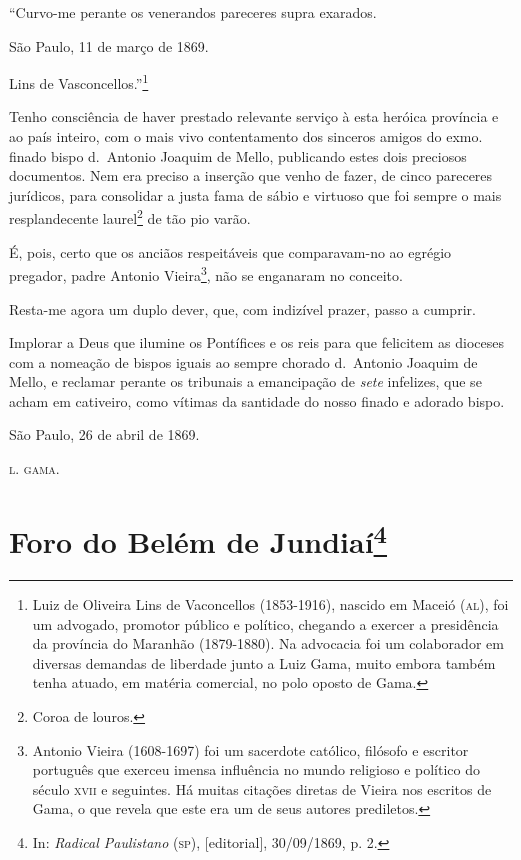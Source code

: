 ``Curvo-me perante os venerandos pareceres supra exarados.

São Paulo, 11 de março de 1869.

Lins de Vasconcellos.''\footnote{Luiz de Oliveira Lins de
  Vaconcellos (1853-1916), nascido em Maceió (\textsc{al}), foi um advogado,
  promotor público e político, chegando a exercer a presidência da
  província do Maranhão (1879-1880). Na advocacia foi um colaborador em
  diversas demandas de liberdade junto a Luiz Gama, muito embora também
  tenha atuado, em matéria comercial, no polo oposto de Gama.}

Tenho consciência de haver prestado relevante serviço à esta heróica
província e ao país inteiro, com o mais vivo contentamento dos sinceros
amigos do exmo.\,finado bispo d.~Antonio Joaquim de Mello, publicando
estes dois preciosos documentos. Nem era preciso a inserção que venho de
fazer, de cinco pareceres jurídicos, para consolidar a justa fama de
sábio e virtuoso que foi sempre o mais resplandecente laurel\footnote{
  Coroa de louros.} de tão pio varão.

É, pois, certo que os anciãos respeitáveis que comparavam-no ao egrégio
pregador, padre Antonio Vieira\footnote{Antonio Vieira (1608-1697) foi
  um sacerdote católico, filósofo e escritor português que exerceu
  imensa influência no mundo religioso e político do século \textsc{xvii} e
  seguintes. Há muitas citações diretas de Vieira nos escritos de Gama,
  o que revela que este era um de seus autores prediletos.}, não se
enganaram no conceito.

Resta-me agora um duplo dever, que, com indizível prazer, passo a
cumprir.

Implorar a Deus que ilumine os Pontífices e os reis para que felicitem
as dioceses com a nomeação de bispos iguais ao sempre chorado d.~Antonio
Joaquim de Mello, e reclamar perante os tribunais a emancipação de
\emph{sete} infelizes, que se acham em cativeiro, como vítimas da
santidade do nosso finado e adorado bispo.
\begin{flushright}
São Paulo, 26 de abril de 1869.

\textsc{l. gama}.
\end{flushright}
\chapter{Foro do Belém de Jundiaí\footnote{In: \emph{Radical Paulistano}
  (\textsc{sp}), {[}editorial{]}, 30/09/1869, p. 2.}}


